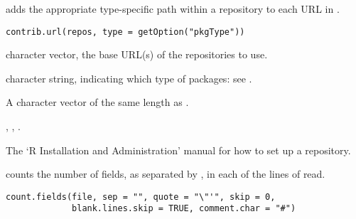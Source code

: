 %
\begin{Description}\relax
{} adds the appropriate type-specific path within a
repository to each URL in .
\end{Description}
%
\begin{Usage}
\begin{verbatim}
contrib.url(repos, type = getOption("pkgType"))
\end{verbatim}
\end{Usage}
%
\begin{Arguments}
\begin{ldescription}
\item[\code{repos}] character vector, the base URL(s) of the repositories
to use.

\item[\code{type}] character string, indicating which type of packages: see
.

\end{ldescription}
\end{Arguments}
%
\begin{Value}
A character vector of the same length as .
\end{Value}
%
\begin{SeeAlso}\relax
{}, ,
.

The `R Installation and Administration' manual for how to 
set up a repository.
\end{SeeAlso}
%
\begin{Description}\relax
{} counts the number of fields, as separated by
, in each of the lines of  read.
\end{Description}
%
\begin{Usage}
\begin{verbatim}
count.fields(file, sep = "", quote = "\"'", skip = 0,
             blank.lines.skip = TRUE, comment.char = "#")
\end{verbatim}
\end{Usage}
%
